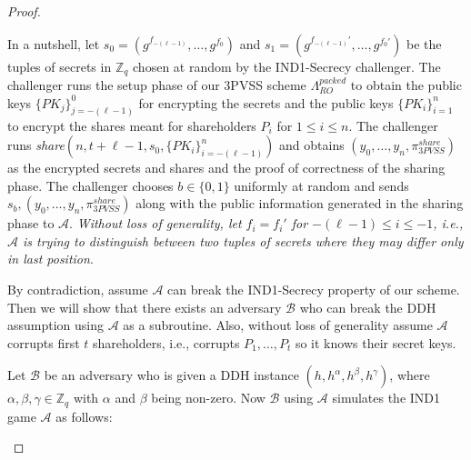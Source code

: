 \begin{proof}
\begin{itemize}
      In a nutshell, let $s_0=(g^{f_{-(\ell-1)}},\dots,g^{f_0})$ and $s_1=(g^{f_{-(\ell-1)}'},\dots,g^{f_0'})$ 
      be the tuples of secrets in $\mathbb{Z}_q$ chosen at random by the IND1-Secrecy challenger. The 
      challenger runs the setup phase of our 3PVSS scheme $\Lambda_{RO}^{packed}$ to obtain the 
      public keys $\{PK_j\}_{j=-(\ell-1)}^0$ for encrypting the secrets and the public keys 
      $\{PK_i\}_{i=1}^n$ to encrypt the shares meant for shareholders $P_i$ for 
      $1\leq i\leq n$. The challenger runs \textit{share}$(n,t+\ell-1,s_0,\{PK_i\}_{i=-(\ell-1)}^n)$ 
      and obtains $(y_0,\dots,y_n,\pi_{3PVSS}^{share})$ as the encrypted secrets and shares and 
      the proof of correctness of the sharing phase. The challenger chooses $b\in\{0,1\}$ uniformly at 
      random and sends $s_b,(y_0,\dots,y_n,\pi_{3PVSS}^{share})$ along with the public information generated in 
      the sharing phase to $\mathcal{A}$. \textit{Without loss of generality, let $f_i=f_i'$ for 
      $-(\ell-1)\leq i\leq -1$, i.e., $\mathcal{A}$ is trying to distinguish between two tuples of 
      secrets where they may differ only in last position}.\par

      By contradiction, assume $\mathcal{A}$ can break the IND1-Secrecy property 
      of our scheme. Then we will show that there exists an adversary $\mathcal{B}$ who can 
      break the DDH assumption using $\mathcal{A}$ as a subroutine. Also, without loss of 
      generality assume $\mathcal{A}$ corrupts first $t$ shareholders, i.e., corrupts 
      $P_1,\dots,P_t$ so it knows their secret keys.\par

      Let $\mathcal{B}$ be an adversary who is given a DDH instance $(h,h^\alpha,h^\beta,h^\gamma)$, 
      where $\alpha,\beta,\gamma\in\mathbb{Z}_q$ with $\alpha$ and $\beta$ being non-zero. 
      Now $\mathcal{B}$ using $\mathcal{A}$ simulates the IND1 game $\mathcal{A}$ as follows:


\end{itemize}
\end{proof}
